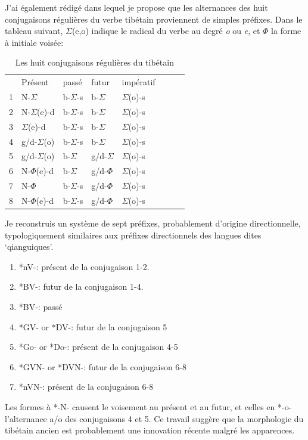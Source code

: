\documentclass[oldfontcommands,oneside,a4paper,11pt]{memoir}
\newcommand{\sig}{\begin{math}\Sigma\end{math}}
\newcommand{\phone}{\begin{math}\Phi\end{math}}
\begin{document}
J'ai également rédigé \citet{jacques12internal} dans lequel je propose que les alternances des huit conjugaisons régulières du verbe tibétain proviennent de simples préfixes. Dans le tableau suivant, \sig{}(e,o) indique le radical du verbe au degré \textit{o} ou \textit{e}, et \phone{} la forme à initiale voisée:


\begin{table}[H]
\caption{Les huit conjugaisons régulières du tibétain } 
\begin{tabular}{llllllll} 
 	&	Présent	&	passé	&	futur	&	impératif	\\
1	&	N-\sig{}	&	b-\sig{}-s	&	b-\sig{}	&	\sig{}(o)-s	\\
2	&	N-\sig{}(e)-d	&	b-\sig{}-s	&	b-\sig{}	&	\sig{}(o)-s	\\
3	&	\sig{}(e)-d	&	b-\sig{}-s	&	b-\sig{}	&	\sig{}(o)-s	\\
4	&	g/d-\sig{}(o)	&	b-\sig{}-s	&	b-\sig{}	&	\sig{}(o)-s	\\
5	&	g/d-\sig{}(o)	&	b-\sig{}	&	g/d-\sig{}	&	\sig{}(o)-s	\\
6	&	N-\phone(e)-d	&	b-\sig{}	&	g/d-\phone{}	&	\sig{}(o)-s	\\
7	&	N-\phone	&	b-\sig{}-s	&	g/d-\phone{}	&	\sig{}(o)-s	\\
8	&	N-\phone(e)-d	&	b-\sig{}-s	&	g/d-\phone{}	&	\sig{}(o)-s	\\
\end{tabular}
\end{table}

Je reconstruis un système de sept préfixes, probablement d'origine directionnelle, typologiquement similaires aux préfixes directionnels des langues dites `qianguiques'.

\begin{enumerate}

\item *nV-: présent de la conjugaison 1-2.
\item *BV-: futur de  la   conjugaison 1-4.
\item *BV-: passé
\item *GV- or *DV-: futur de  la   conjugaison 5
\item *Go- or *Do-: présent de la conjugaison 4-5
\item *GVN- or *DVN-: futur de  la   conjugaison 6-8
\item *nVN-:  présent de la conjugaison 6-8
\end{enumerate}
Les formes à *-N- causent le voisement au présent et au futur, et celles en *-o- l'alternance a/o des conjugaisons 4 et 5. Ce travail suggère que la morphologie du tibétain ancien est probablement une innovation récente malgré les apparences. 
\end{document}
